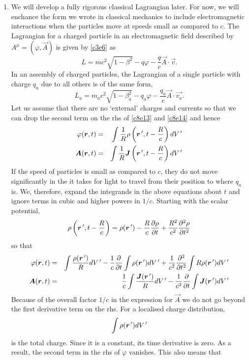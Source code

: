 \begin{enumerate}
\item We will develop a fully rigorous classical Lagrangian later. For now, we
will enchance the form we wrote in classical mechanics to include 
electromagnetic interactions when the particles move at speeds small as compared
to $c$. The Lagrangian for a charged particle in an electromagnetic field 
described by $A^\mu = (\varphi, \vec{A})$ is given by \eqref{c3e6} as 
\[
L = mc^2\sqrt{1 - \beta^2} - q\varphi - \frac{q}{c}\vec{A}\cdot\vec{v}.
\]
In an assembly of charged particles, the Lagrangian of a single particle with
charge $q_a$ due to all others is of the same form,
\begin{equation}\label{c8e44}
L_a = m_ac^2\sqrt{1 - \beta_a^2} - q_a\varphi - 
\frac{q_a}{c}\vec{A}\cdot\vec{v_a}.
\end{equation}
Let us assume that there are no `external' charges and currents so that we can
drop the second term on the rhs of \eqref{c8e13} and \eqref{c8e14} and hence
\begin{eqnarray*}
\varphi(\bm{r}, t) &=& \int\frac{1}{R}\rho
\left(\bm{r}^{\,\prime}, t - \frac{R}{c}\right)dV^{\,\prime} \\
\bm{A}(\bm{r}, t) &=& \int\frac{1}{R}\bm{J}
\left(\bm{r}^{\,\prime}, t - \frac{R}{c}\right)dV^{\,\prime} 
\end{eqnarray*}
If the speed of particles is small as compared to $c$, they do not move 
significantly in the it takes for light to travel from their position to where
$q_a$ is. We, therefore, expand the integrands in the above equations about
$t$ and ignore terms in cubic and higher powers in $1/c$. Starting with the
scalar potential,
\[
\rho\left(\bm{r}^{\,\prime}, t - \frac{R}{c}\right) = \rho(\bm{r}^{\,\prime}) -
\frac{R}{c}\frac{\partial{\rho}}{\partial{t}} + \frac{R^2}{c^2}\frac{\partial^2{\rho}}{\partial{t}^2}
\]
so that
\begin{eqnarray*}
\varphi(\bm{r}, t) &=& \int\frac{\rho(\bm{r}^{\,\prime})}{R}dV^{\,\prime} - \frac{1}{c}
\frac{\partial}{\partial t}\int\rho(\bm{r}^{\,\prime})dV^{\,\prime} + \frac{1}{c^2}
\frac{\partial^2}{\partial t^2}\int R\rho(\bm{r}^{\,\prime})dV^{\,\prime} \\
\bm{A}(\bm{r}, t) &=& \frac{1}{c}\int\frac{\bm{J}(\bm{r}^{\,\prime})}{R}dV^{\,\prime} - 
\frac{1}{c^2}\frac{\partial}{\partial t}\int\bm{J}(\bm{r}^{\,\prime})dV^{\,\prime} 
\end{eqnarray*}
Because of the overall factor $1/c$ in the expression for $\vec{A}$ we do not
go beyond the first derivative term on the rhs. For a localised charge 
distribution,
\[
\int\rho(\bm{r}^{\,\prime})dV^{\,\prime}
\]
is the total charge. Since it is a constant, its time derivative is zero. As
a result, the second term in the rhs of $\varphi$ vanishes. This also means that

\end{enumerate}
